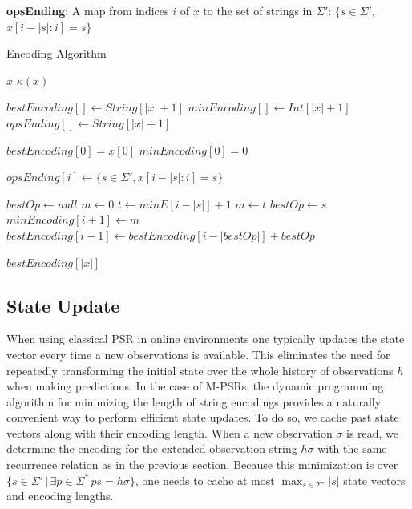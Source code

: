 \documentclass[letterpaper]{article}
\begin{document}
\textbf{opsEnding}: A map from indices $i$ of $x$ to the set of strings in $\Sigma'$: $\{s \in \Sigma',$ $x[i-|s|:i] = s\}$

\algnewcommand{}
\algnewcommand{}

\algnewcommand\INPUT{\item[\algorithmicinput]}
\algnewcommand\OUTPUT{\item[\algorithmicoutput]}

\begin{algorithm}
\caption{Encoding Algorithm}
\label{Encoding Algorithm}
\begin{algorithmic}[1]
\INPUT $x$
\OUTPUT $\kappa(x)$


\State $bestEncoding[] \gets String[|x|+1]$
\State $minEncoding[] \gets Int[|x|+1]$
\State $opsEnding[] \gets String[|x|+1]$

\State $bestEncoding[0] = x[0]$
\State $minEncoding[0] = 0$

	 \State $opsEnding[i] \gets \{s \in \Sigma', x[i-|s|:i] = s\}$
\EndFor

	\State $bestOp \gets null$
	\State $m \gets 0$ 
		\State $t \gets minE[i-|s|] + 1$
			\State $m \gets t$ 
			\State $bestOp \gets s$
		\EndIf
	\EndFor
	\State $minEncoding[i+1] \gets m$
	\State $bestEncoding[i+1] \gets bestEncoding[i-|bestOp|] + bestOp$
\EndFor

\State \Return $bestEncoding[|x|]$

\EndProcedure
\end{algorithmic}
\end{algorithm}


\subsection{State Update}

When using classical PSR in online environments one typically updates the state vector every time a new observations is available. This eliminates the need for repeatedly transforming the initial state over the whole history of observations $h$ when making predictions. In the case of M-PSRs, the dynamic programming algorithm for minimizing the length of string encodings provides a naturally convenient way to perform efficient state updates. To do so, we cache past state vectors along with their encoding length. When a new observation $\sigma$ is read, we determine the encoding for the extended observation string $h \sigma$ with the same recurrence relation as in the previous section. Because this minimization is over $\{s \in \Sigma' \,|\, \exists p \in \Sigma^* \, ps= h\sigma\}$, one needs to cache at most $\max_{s \in \Sigma'} |s|$ state vectors and encoding lengths. 
\end{document}
